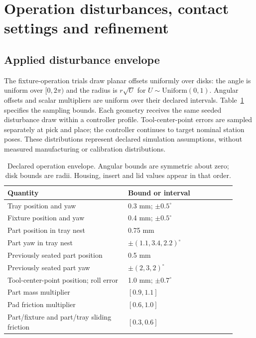 \section{Operation disturbances, contact settings and refinement}
\subsection{Applied disturbance envelope}
The fixture-operation trials draw planar offsets uniformly over disks: the angle is uniform over $[0,2\pi)$ and the radius is $r\sqrt{U}$ for $U\sim\mathrm{Uniform}(0,1)$. Angular offsets and scalar multipliers are uniform over their declared intervals. Table~\ref{tab:operation-envelope-details} specifies the sampling bounds. Each geometry receives the same seeded disturbance draw within a controller profile. Tool-center-point errors are sampled separately at pick and place; the controller continues to target nominal station poses. These distributions represent declared simulation assumptions, without measured manufacturing or calibration distributions.

\begin{table}[htbp]
\centering\small
\caption{Declared operation envelope. Angular bounds are symmetric about zero; disk bounds are radii. Housing, insert and lid values appear in that order.}
\label{tab:operation-envelope-details}
\begin{tabular}{@{}p{0.48\linewidth}p{0.43\linewidth}@{}}
\toprule
Quantity & Bound or interval\\
\midrule
Tray position and yaw & 0.3 mm; $\pm0.5^\circ$\\
Fixture position and yaw & 0.4 mm; $\pm0.5^\circ$\\
Part position in tray nest & 0.75 mm\\
Part yaw in tray nest & $\pm(1.1,3.4,2.2)^\circ$\\
Previously seated part position & 0.5 mm\\
Previously seated part yaw & $\pm(2,3,2)^\circ$\\
Tool-center-point position; roll error & 1.0 mm; $\pm0.7^\circ$\\
Part mass multiplier & $[0.9,1.1]$\\
Pad friction multiplier & $[0.6,1.0]$\\
Part/fixture and part/tray sliding friction & $[0.3,0.6]$\\
\bottomrule
\end{tabular}
\end{table}

